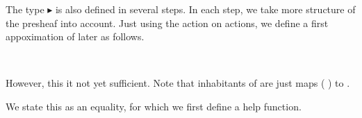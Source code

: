 The type $\blacktriangleright$  is also defined in several steps.
In each step, we take more structure of the presheaf  into account.
Just using the action on actions, we define a first appoximation of later as follows.

\begin{code}%
\>[0]\AgdaSpace{}%
\AgdaSymbol{:}\AgdaSpace{}%
\AgdaSymbol{(}\AgdaSpace{}%
\AgdaSpace{}%
\AgdaSymbol{)}\AgdaSpace{}%
\AgdaSpace{}%
\AgdaSpace{}%
\AgdaSpace{}%
\<%
\\
\>[0]\AgdaSpace{}%
\AgdaSpace{}%
\AgdaSpace{}%
\AgdaSymbol{=}\AgdaSpace{}%
\AgdaSymbol{(}\AgdaSpace{}%
\AgdaSymbol{:}\AgdaSpace{}%
\AgdaSpace{}%
\AgdaSymbol{)}\AgdaSpace{}%
\AgdaSpace{}%
\AgdaSpace{}%
\AgdaSymbol{(}\AgdaSpace{}%
\AgdaSymbol{)}\<%
\end{code}

However, this it not yet sufficient.
Note that inhabitants of   are just maps  ( ) to .

We state this as an equality, for which we first define a help function.

\begin{code}%
\>[0]\AgdaSpace{}%
\AgdaSymbol{:}\AgdaSpace{}%
\AgdaSymbol{\{}\AgdaSpace{}%
\AgdaSymbol{:}\AgdaSpace{}%
\AgdaSpace{}%
\AgdaSpace{}%
\AgdaSymbol{\}}\AgdaSpace{}%
\AgdaSymbol{\{}\AgdaSpace{}%
\AgdaSymbol{:}\AgdaSpace{}%
\AgdaSymbol{\}}\AgdaSpace{}%
\AgdaSymbol{(}\AgdaSpace{}%
\AgdaSymbol{:}\AgdaSpace{}%
\AgdaSpace{}%
\AgdaSymbol{)}\<%
\\
\>[0][@{}l@{\AgdaIndent{0}}]%
\>[2]\AgdaSpace{}%
\AgdaSymbol{((}\AgdaSpace{}%
\AgdaSymbol{:}\AgdaSpace{}%
\AgdaSpace{}%
\AgdaSymbol{)}\AgdaSpace{}%
\AgdaSpace{}%
\AgdaSpace{}%
\AgdaSymbol{)}\AgdaSpace{}%
\AgdaSpace{}%
\AgdaSpace{}%
\AgdaSymbol{(}\AgdaSpace{}%
\AgdaSymbol{)}\<%
\\
\>[0]\AgdaSpace{}%
\AgdaOperator{\AgdaInductiveConstructor{[}}\AgdaSpace{}%
\AgdaSpace{}%
\AgdaOperator{\AgdaInductiveConstructor{]}}\AgdaSpace{}%
\AgdaSpace{}%
\AgdaSymbol{=}\AgdaSpace{}%
\AgdaSpace{}%
\<%
\end{code}

